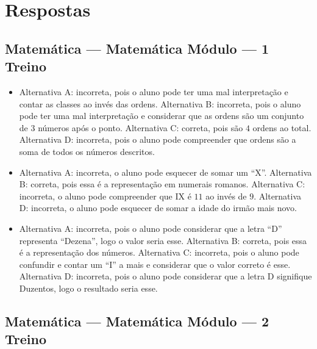 
\chapter*{Respostas}

\footnotesize

\pagecolor{gray!40}

\section*{Matemática — Matemática Módulo — 1 Treino}

\begin{itemize}


\item Alternativa A: incorreta, pois o aluno pode ter uma mal interpretação e
contar as classes ao invés das ordens.
Alternativa B: incorreta, pois o aluno pode ter uma mal interpretação e
considerar que as ordens são um conjunto de $3$ números após o ponto.
Alternativa C: correta, pois são $4$ ordens ao total.
Alternativa D: incorreta, pois o aluno pode compreender que ordens são a
soma de todos os números descritos.

\item Alternativa A: incorreta, o aluno pode esquecer de somar um ``X''.
Alternativa B: correta, pois essa é a representação em numerais romanos.
Alternativa C: incorreta, o aluno pode compreender que IX é $11$ ao invés
de $9$.
Alternativa D: incorreta, o aluno pode esquecer de somar a idade do
irmão mais novo.

\item Alternativa A: incorreta, pois o aluno pode considerar que a letra ``D''
representa ``Dezena'', logo o valor seria esse.
Alternativa B: correta, pois essa é a representação dos números.
Alternativa C: incorreta, pois o aluno pode confundir e contar um ``I''
a mais e considerar que o valor correto é esse.
Alternativa D: incorreta, pois o aluno pode considerar que a letra D
signifique Duzentos, logo o resultado seria esse.
\end{itemize}

\section*{Matemática — Matemática Módulo — 2 Treino}

